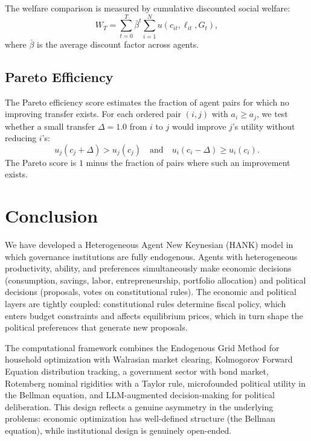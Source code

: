 \documentclass[12pt]{article}
\begin{document}
The welfare comparison is measured by cumulative discounted social welfare:
\begin{equation}\label{eq:cumulative_welfare}
  W_T = \sum_{t=0}^{T} \bar{\beta}^t \sum_{i=1}^{N} u(c_{it}, \ell_{it}, G_t),
\end{equation}
where $\bar{\beta}$ is the average discount factor across agents.


\subsection{Pareto Efficiency}

The Pareto efficiency score estimates the fraction of agent pairs for which no improving transfer exists. For each ordered pair $(i, j)$ with $a_i \geq a_j$, we test whether a small transfer $\Delta = 1.0$ from $i$ to $j$ would improve $j$'s utility without reducing $i$'s:
\begin{equation}\label{eq:pareto_test}
  u_j(c_j + \Delta) > u_j(c_j) \quad \text{and} \quad u_i(c_i - \Delta) \geq u_i(c_i).
\end{equation}
The Pareto score is $1$ minus the fraction of pairs where such an improvement exists.


\section{Conclusion}\label{sec:conclusion}

We have developed a Heterogeneous Agent New Keynesian (HANK) model in which governance institutions are fully endogenous. Agents with heterogeneous productivity, ability, and preferences simultaneously make economic decisions (consumption, savings, labor, entrepreneurship, portfolio allocation) and political decisions (proposals, votes on constitutional rules). The economic and political layers are tightly coupled: constitutional rules determine fiscal policy, which enters budget constraints and affects equilibrium prices, which in turn shape the political preferences that generate new proposals.

The computational framework combines the Endogenous Grid Method for household optimization with Walrasian market clearing, Kolmogorov Forward Equation distribution tracking, a government sector with bond market, Rotemberg nominal rigidities with a Taylor rule, microfounded political utility in the Bellman equation, and LLM-augmented decision-making for political deliberation. This design reflects a genuine asymmetry in the underlying problems: economic optimization has well-defined structure (the Bellman equation), while institutional design is genuinely open-ended.
\end{document}

